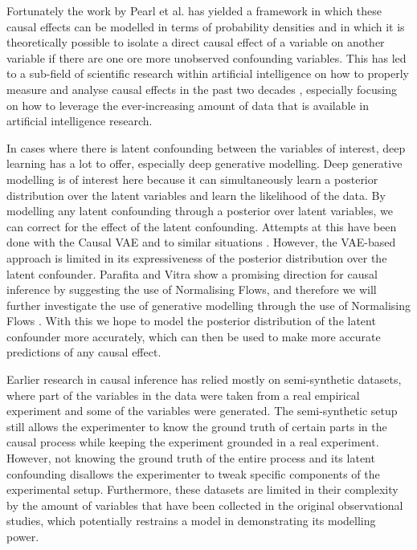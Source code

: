 \documentclass{report}
\begin{document}
Fortunately the work by Pearl et al.\cite{pearl2009causal} \cite{pearl1995causal} has yielded a framework in which these causal effects can be modelled in terms of probability densities and in which it is theoretically possible to isolate a direct causal effect of a variable on another variable if there are one ore more unobserved confounding variables. This has led to a sub-field of scientific research within artificial intelligence on how to properly measure and analyse causal effects in the past two decades \cite{pearl2003statistics} \cite{hill2011bayesian} \cite{guo2020survey}\cite{mooij2016distinguishing}, especially focusing on how to leverage the ever-increasing amount of data that is available in artificial intelligence research.

In cases where there is latent confounding between the variables of interest, deep learning has a lot to offer, especially deep generative modelling. Deep generative modelling is of interest here because it can simultaneously learn a posterior distribution over the latent variables and learn the likelihood of the data. By modelling any latent confounding through a posterior over latent variables, we can correct for the effect of the latent confounding.  %
Attempts at this have been done with the Causal VAE \cite{louizos2017causal} and to similar situations \cite{parafita2020causal}.  However, the VAE-based approach is limited in its expressiveness of the posterior distribution over the latent confounder. Parafita and Vitra \cite{parafita2020causal} show a promising direction for causal inference by suggesting the use of Normalising Flows, and therefore we will further investigate the use of generative modelling through the use of Normalising Flows \cite{rezende2016variational}. With this we hope to model the posterior distribution of the latent confounder more accurately, which can then be used to make more accurate predictions of any causal effect.

Earlier research in causal inference has relied mostly on semi-synthetic datasets, where part of the variables in the data were taken from a real empirical experiment and some of the variables were generated. The semi-synthetic setup still allows the experimenter to know the ground truth of certain parts in the causal process while keeping the experiment grounded in a real experiment. However, not knowing the ground truth of the entire process and its latent confounding disallows the experimenter to tweak specific components of the experimental setup. Furthermore, these datasets are limited in their complexity by the amount of variables that have been collected in the original observational studies, which potentially restrains a model in demonstrating its modelling power. 
\end{document}
